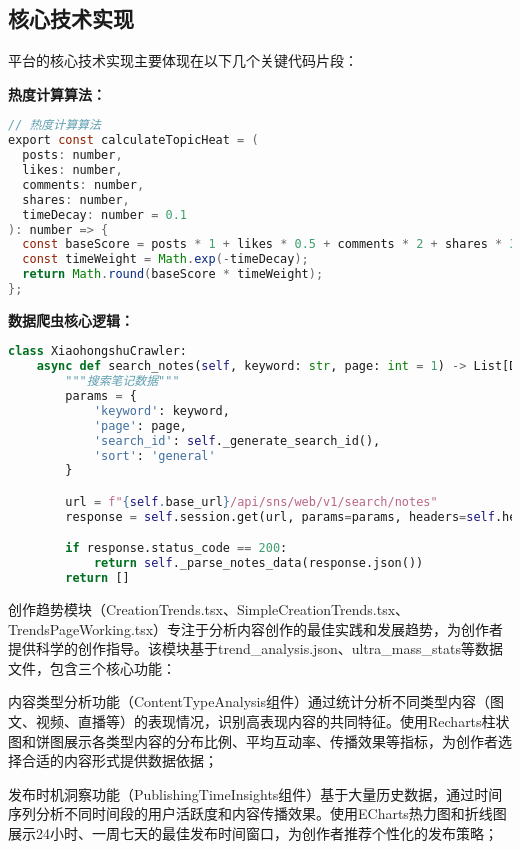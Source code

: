 \documentclass[12pt,a4paper]{article}
\begin{document}
\subsection{核心技术实现}

平台的核心技术实现主要体现在以下几个关键代码片段：

\textbf{热度计算算法：}

\begin{lstlisting}[language=Java, caption=话题热度计算核心算法]
// 热度计算算法
export const calculateTopicHeat = (
  posts: number,
  likes: number,
  comments: number,
  shares: number,
  timeDecay: number = 0.1
): number => {
  const baseScore = posts * 1 + likes * 0.5 + comments * 2 + shares * 3;
  const timeWeight = Math.exp(-timeDecay);
  return Math.round(baseScore * timeWeight);
};
\end{lstlisting}

\textbf{数据爬虫核心逻辑：}

\begin{lstlisting}[language=Python, caption=小红书数据爬虫关键方法]
class XiaohongshuCrawler:
    async def search_notes(self, keyword: str, page: int = 1) -> List[Dict]:
        """搜索笔记数据"""
        params = {
            'keyword': keyword,
            'page': page,
            'search_id': self._generate_search_id(),
            'sort': 'general'
        }

        url = f"{self.base_url}/api/sns/web/v1/search/notes"
        response = self.session.get(url, params=params, headers=self.headers)

        if response.status_code == 200:
            return self._parse_notes_data(response.json())
        return []
\end{lstlisting}

创作趋势模块（CreationTrends.tsx、SimpleCreationTrends.tsx、TrendsPageWorking.tsx）专注于分析内容创作的最佳实践和发展趋势，为创作者提供科学的创作指导。该模块基于trend\_analysis.json、ultra\_mass\_stats等数据文件，包含三个核心功能：

内容类型分析功能（ContentTypeAnalysis组件）通过统计分析不同类型内容（图文、视频、直播等）的表现情况，识别高表现内容的共同特征。使用Recharts柱状图和饼图展示各类型内容的分布比例、平均互动率、传播效果等指标，为创作者选择合适的内容形式提供数据依据；

发布时机洞察功能（PublishingTimeInsights组件）基于大量历史数据，通过时间序列分析不同时间段的用户活跃度和内容传播效果。使用ECharts热力图和折线图展示24小时、一周七天的最佳发布时间窗口，为创作者推荐个性化的发布策略；
\end{document}
